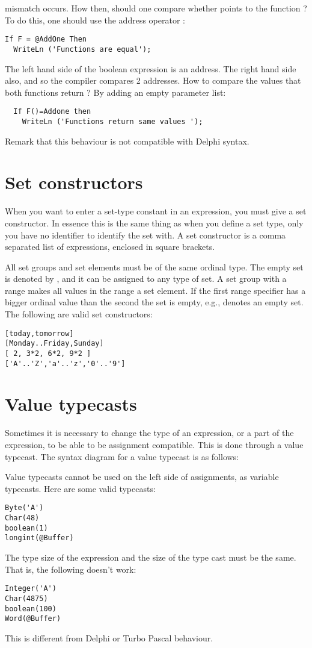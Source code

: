 \documentclass{report}
\begin{document}
mismatch occurs.
How then, should one compare whether  points to the function
 ? To do this, one should use the address operator :
\begin{verbatim}
If F = @AddOne Then
  WriteLn ('Functions are equal');
\end{verbatim}
The left hand side of the boolean expression is an address. The right hand
side also, and so the compiler compares 2 addresses.
How to compare the values that both functions return ? By adding an empty
parameter list:
\begin{verbatim}
  If F()=Addone then
    WriteLn ('Functions return same values ');
\end{verbatim}
Remark that this behaviour is not compatible with Delphi syntax.

\section{Set constructors}
When you want to enter a set-type constant in an expression, you must give a
set constructor. In essence this is the same thing as when you define a set
type, only you have no identifier to identify the set with.
A set constructor is a comma separated list of expressions, enclosed in
square brackets.

All set groups and set elements must be of the same ordinal type.
The empty set is denoted by \var{[]}, and it can be assigned to any type of
set. A set group with a range  \var{[A..Z]} makes all values in the range a
set element. If the first range specifier has a bigger ordinal value than
the second the set is empty, e.g., \var{[Z..A]} denotes an empty set.
The following are valid set constructors:
\begin{verbatim}
[today,tomorrow]
[Monday..Friday,Sunday]
[ 2, 3*2, 6*2, 9*2 ]
['A'..'Z','a'..'z','0'..'9']
\end{verbatim}

\section{Value typecasts}
Sometimes it is necessary to change the type of an expression, or a part of
the expression, to be able to be assignment compatible. This is done through
a value typecast. The syntax diagram for a value typecast is as follows:

Value typecasts cannot be used on the left side of assignments, as variable
typecasts.
Here are some valid typecasts:
\begin{verbatim}
Byte('A')
Char(48)
boolean(1)
longint(@Buffer)
\end{verbatim}
The type size of the expression and the size of the type cast must be the
same. That is, the following doesn't work:
\begin{verbatim}
Integer('A')
Char(4875)
boolean(100)
Word(@Buffer)
\end{verbatim}
This is different from Delphi or Turbo Pascal behaviour.
\end{document}
